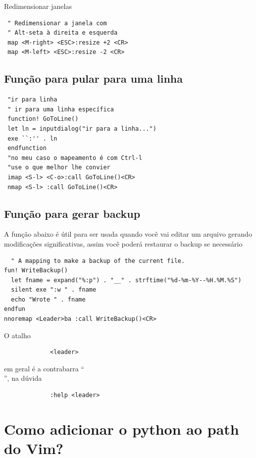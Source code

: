\documentclass[10pt,a4paper,openany]{book}
\begin{document}
Redimensionar janelas

\begin{verbatim}
 " Redimensionar a janela com
 " Alt-seta à direita e esquerda
 map <M-right> <ESC>:resize +2 <CR>
 map <M-left> <ESC>:resize -2 <CR>
\end{verbatim}

\subsection{Função para pular para uma linha}
\label{Função para pular para uma linha}

\begin{verbatim}
 "ir para linha
 " ir para uma linha específica
 function! GoToLine()
 let ln = inputdialog("ir para a linha...")
 exe ``:'' . ln
 endfunction
 "no meu caso o mapeamento é com Ctrl-l
 "use o que melhor lhe convier
 imap <S-l> <C-o>:call GoToLine()<CR>
 nmap <S-l> :call GoToLine()<CR>
\end{verbatim}

\subsection{Função para gerar backup}
\label{Função para gerar backup}

A função abaixo é útil para ser usada quando você vai editar um arquivo
gerando modificações significativas, assim você poderá restaurar o backup se necessário

\begin{verbatim}
  " A mapping to make a backup of the current file.
fun! WriteBackup()
  let fname = expand("%:p") . "__" . strftime("%d-%m-%Y--%H.%M.%S")
  silent exe ":w " . fname
  echo "Wrote " . fname
endfun
nnoremap <Leader>ba :call WriteBackup()<CR>
\end{verbatim}

O atalho

\begin{verbatim}
			 <leader>
\end{verbatim}

em geral é a contrabarra ``\\'', na dúvida

\begin{verbatim}
			 :help <leader>
\end{verbatim}

\section{Como adicionar o python ao path do Vim?}
\label{Como adicionar o python ao path do Vim?}
\end{document}
